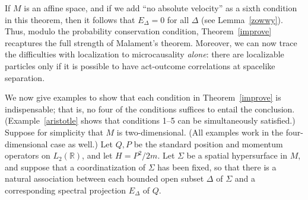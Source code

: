 \documentclass[11pt]{article}
\theoremstyle{remark}
\begin{document}
If $M$ is an affine space, and if we add ``no absolute velocity'' as a
sixth condition in this theorem, then it follows that $E_{\Delta}=0$
for all $\Delta$ (see Lemma~\ref{zowwy}).  Thus, modulo the
probability conservation condition, Theorem~\ref{improve} recaptures
the full strength of Malament's theorem.  Moreover, we can now trace
the difficulties with localization to microcausality \emph{alone}:
there are localizable particles only if it is possible to have
act-outcome correlations at spacelike separation.

We now give examples to show that each condition in
Theorem~\ref{improve} is indispensable; that is, no four of the
conditions suffices to entail the conclusion.
(Example~\ref{aristotle} shows that conditions 1--5 can be
simultaneously satisfied.)  Suppose for simplicity that $M$ is
two-dimensional.  (All examples work in the four-dimensional case as
well.)  Let $Q,P$ be the standard position and momentum operators on
$L_{2}(\mathbb{R})$, and let $H=P^{2}/2m$.  Let $\Sigma$ be a spatial
hypersurface in $M$, and suppose that a coordinatization of $\Sigma$
has been fixed, so that there is a natural association between each
bounded open subset $\Delta$ of $\Sigma$ and a corresponding spectral
projection $E_{\Delta}$ of $Q$.
\end{document}

